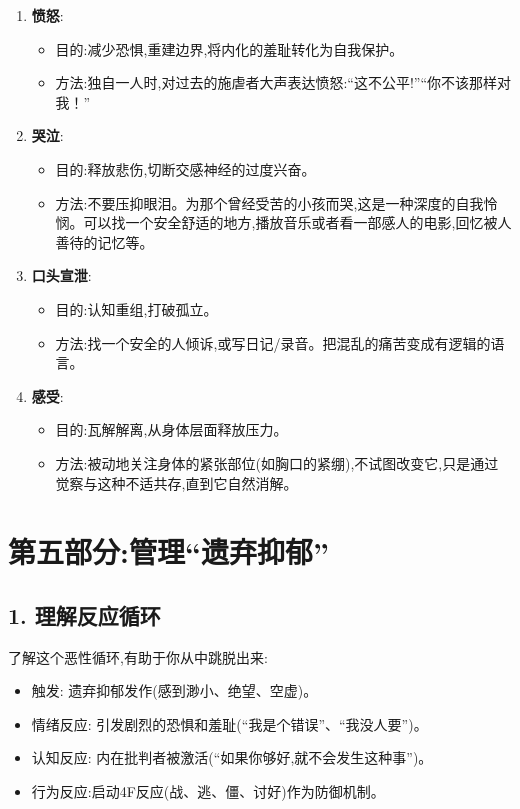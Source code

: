 \documentclass[11pt, a4paper]{article}
\begin{document}
\begin{enumerate}
    \item \textbf{愤怒}:
    \begin{itemize}
        \item 目的:减少恐惧,重建边界,将内化的羞耻转化为自我保护。
        \item 方法:独自一人时,对过去的施虐者大声表达愤怒:“这不公平!”“你不该那样对我！”
    \end{itemize}
    
    \item \textbf{哭泣}:
    \begin{itemize}
        \item 目的:释放悲伤,切断交感神经的过度兴奋。
        \item 方法:不要压抑眼泪。为那个曾经受苦的小孩而哭,这是一种深度的自我怜悯。可以找一个安全舒适的地方,播放音乐或者看一部感人的电影,回忆被人善待的记忆等。
    \end{itemize}
    
    \item \textbf{口头宣泄}:
    \begin{itemize}
        \item 目的:认知重组,打破孤立。
        \item 方法:找一个安全的人倾诉,或写日记/录音。把混乱的痛苦变成有逻辑的语言。
    \end{itemize}
    
    \item \textbf{感受}:
    \begin{itemize}
        \item 目的:瓦解解离,从身体层面释放压力。
        \item 方法:被动地关注身体的紧张部位(如胸口的紧绷),不试图改变它,只是通过觉察与这种不适共存,直到它自然消解。
    \end{itemize}
\end{enumerate}

\vspace{1cm}

\section{第五部分:管理“遗弃抑郁”}

\subsection*{1. 理解反应循环}
了解这个恶性循环,有助于你从中跳脱出来:
\begin{itemize}
    \item 触发: 遗弃抑郁发作(感到渺小、绝望、空虚)。
    \item 情绪反应: 引发剧烈的恐惧和羞耻(“我是个错误”、“我没人要”)。
    \item 认知反应: 内在批判者被激活(“如果你够好,就不会发生这种事”)。
    \item 行为反应:启动4F反应(战、逃、僵、讨好)作为防御机制。
\end{itemize}
\end{document}
